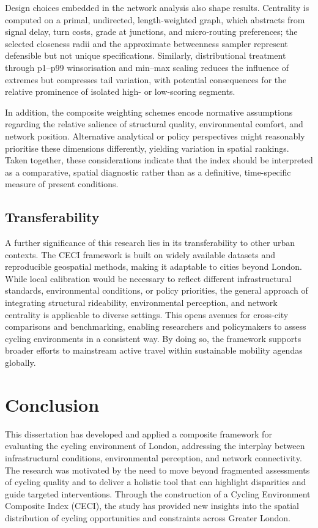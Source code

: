 \documentclass[
  12pt,
  oneside]{book}
\begin{document}
Design choices embedded in the network analysis also shape results. Centrality is computed on a primal, undirected, length-weighted graph, which abstracts from signal delay, turn costs, grade at junctions, and micro-routing preferences; the selected closeness radii and the approximate betweenness sampler represent defensible but not unique specifications. Similarly, distributional treatment through p1--p99 winsorisation and min--max scaling reduces the influence of extremes but compresses tail variation, with potential consequences for the relative prominence of isolated high- or low-scoring segments.

In addition, the composite weighting schemes encode normative assumptions regarding the relative salience of structural quality, environmental comfort, and network position. Alternative analytical or policy perspectives might reasonably prioritise these dimensions differently, yielding variation in spatial rankings. Taken together, these considerations indicate that the index should be interpreted as a comparative, spatial diagnostic rather than as a definitive, time-specific measure of present conditions.

\section{Transferability}\label{transferability}

A further significance of this research lies in its transferability to other urban contexts. The CECI framework is built on widely available datasets and reproducible geospatial methods, making it adaptable to cities beyond London. While local calibration would be necessary to reflect different infrastructural standards, environmental conditions, or policy priorities, the general approach of integrating structural rideability, environmental perception, and network centrality is applicable to diverse settings. This opens avenues for cross-city comparisons and benchmarking, enabling researchers and policymakers to assess cycling environments in a consistent way. By doing so, the framework supports broader efforts to mainstream active travel within sustainable mobility agendas globally.

\chapter{Conclusion}\label{conclusion-1}

This dissertation has developed and applied a composite framework for evaluating the cycling environment of London, addressing the interplay between infrastructural conditions, environmental perception, and network connectivity. The research was motivated by the need to move beyond fragmented assessments of cycling quality and to deliver a holistic tool that can highlight disparities and guide targeted interventions. Through the construction of a Cycling Environment Composite Index (CECI), the study has provided new insights into the spatial distribution of cycling opportunities and constraints across Greater London.
\end{document}
